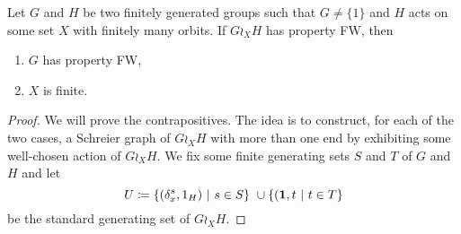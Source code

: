 %
%
\begin{lem}\label{Lem:Wreath_groups_ends}
Let $G$ and $H$ be two finitely generated groups such that $G\neq \{1\}$ and $H$ acts on some set $X$ with finitely many orbits.
If $G\wr_XH$ has property FW, then 
\begin{enumerate}
\item $G$ has property FW,
\item $X$ is finite.
\end{enumerate}
%
\begin{proof}
We will prove the contrapositives. The idea is to construct, for each of the two cases, a Schreier graph of $G\wr_XH$ with more than one end by exhibiting some well-chosen action of $G\wr_XH$.
We fix some finite generating sets $S$ and $T$ of $G$ and $H$ and let 
\[U\coloneqq\setst{(\delta_x^s,1_H)}{s \in S} \cup \setst{(\mathbf 1,t}{t \in T}\]
be the standard generating set of $G\wr_XH$.


\end{proof}
\end{lem}

